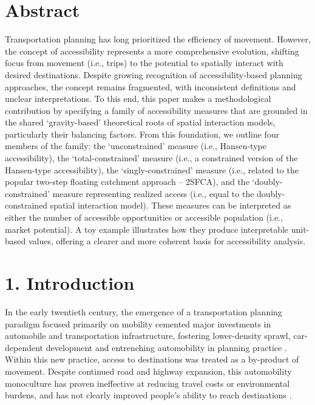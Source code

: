 \documentclass[
  10pt,
  letterpaper,
]{article}
\begin{document}
\section*{Abstract}
Transportation planning has long prioritized the efficiency of movement.
However, the concept of accessibility represents a more comprehensive
evolution, shifting focus from movement (i.e., trips) to the potential
to spatially interact with desired destinations. Despite growing
recognition of accessibility-based planning approaches, the concept
remains fragmented, with inconsistent definitions and unclear
interpretations. To this end, this paper makes a methodological
contribution by specifying a family of accessibility measures that are
grounded in the shared `gravity-based' theoretical roots of spatial
interaction models, particularly their balancing factors. From this
foundation, we outline four members of the family: the `unconstrained'
measure (i.e., Hansen-type accessibility), the `total-constrained'
measure (i.e., a constrained version of the Hansen-type accessibility),
the `singly-constrained' measure (i.e., related to the popular two-step
floating catchment approach -- 2SFCA), and the `doubly-constrained'
measure representing realized access (i.e., equal to the
doubly-constrained spatial interaction model). These measures can be
interpreted as either the number of accessible opportunities or
accessible population (i.e., market potential). A toy example
illustrates how they produce interpretable unit-based values, offering a
clearer and more coherent basis for accessibility analysis.


\linenumbers

\section{1. Introduction}\label{introduction}

In the early twentieth century, the emergence of a transportation
planning paradigm focused primarily on mobility cemented major
investments in automobile and transportation infrastructure, fostering
lower-density sprawl, car-dependent development and entrenching
automobility in planning practice
\citep{miller_collaborative_2011, lavery_driving_2013}. Within this new
practice, access to destinations was treated as a by-product of
movement. Despite continued road and highway expansion, this
automobility monoculture has proven ineffective at reducing travel costs
or environmental burdens, and has not clearly improved people's ability
to reach destinations
\citep{farber_running_2011, handyACCESSIBILITYVSMOBILITYENHANCING2002, paez_healthcare_2010}.
\end{document}
